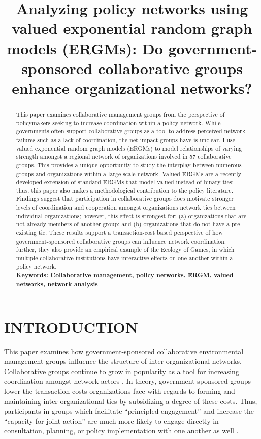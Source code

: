 \documentclass[12pt,a4paper,titlepage]{article}
\title{Analyzing policy networks using valued exponential random graph models (ERGMs): Do government-sponsored collaborative groups enhance organizational networks?}
\begin{document}
\singlespacing
\maketitle

\begin{abstract}
\doublespacing

This paper examines collaborative management groups from the perspective of policymakers seeking to increase coordination within a policy network. While governments often support collaborative groups as a tool to address perceived network failures such as a lack of coordination, the net impact groups have is unclear. I use valued exponential random graph models (ERGMs) to model relationships of varying strength amongst a regional network of organizations involved in 57 collaborative groups. This provides a unique opportunity to study the interplay between numerous groups and organizations within a large-scale network. Valued ERGMs are a recently developed extension of standard ERGMs that model valued instead of binary ties; thus, this paper also makes a methodological contribution to the policy literature. Findings suggest that participation in collaborative groups does motivate stronger levels of coordination and cooperation amongst organizations network ties between individual organizations; however, this effect is strongest for: (a) organizations that are not already members of another group; and (b) organizations that do not have a pre-existing tie. These results support a transaction-cost based perspective of how government-sponsored collaborative groups can influence network coordination; further, they also provide an empirical example of the Ecology of Games, in which multiple collaborative institutions have interactive effects on one another within a policy network.\\



\noindent
\bf{Keywords}: Collaborative management, policy networks, ERGM, valued networks, network analysis
\end{abstract}

\doublespacing
\section{\bf\MakeUppercase{Introduction}}

This paper examines how government-sponsored collaborative environmental management groups influence the structure of inter-organizational networks. Collaborative groups continue to grow in popularity as a tool for increasing coordination amongst network actors \parencite{margerum2011}. In theory, government-sponsored groups lower the transaction costs organizations face with regards to forming and maintaining inter-organizational ties by subsidizing a degree of these costs. Thus, participants in groups which facilitate ``principled engagement'' and increase the ``capacity for joint action'' \parencite{emerson2012} are much more likely to engage directly in consultation, planning, or policy implementation with one another as well \parencite{scott2015-a}.
\end{document}
